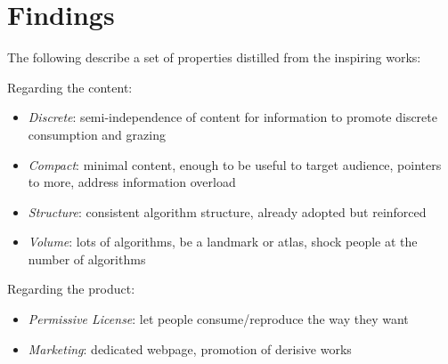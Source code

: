 \documentclass[a4paper, 11pt]{article}
\begin{document}
\section{Findings}
\label{sec:findings}

The following describe a set of properties distilled from the inspiring works:

Regarding the content:
\begin{itemize}
	\item \emph{Discrete}: semi-independence of content for information to promote discrete consumption and grazing
	\item \emph{Compact}: minimal content, enough to be useful to target audience, pointers to more, address information overload 
	\item \emph{Structure}: consistent algorithm structure, already adopted but reinforced
	\item \emph{Volume}: lots of algorithms, be a landmark or atlas, shock people at the number of algorithms
\end{itemize}

Regarding the product:
\begin{itemize}
	\item \emph{Permissive License}: let people consume/reproduce the way they want
	\item \emph{Marketing}: dedicated webpage, promotion of derisive works
\end{itemize}




\end{document}
